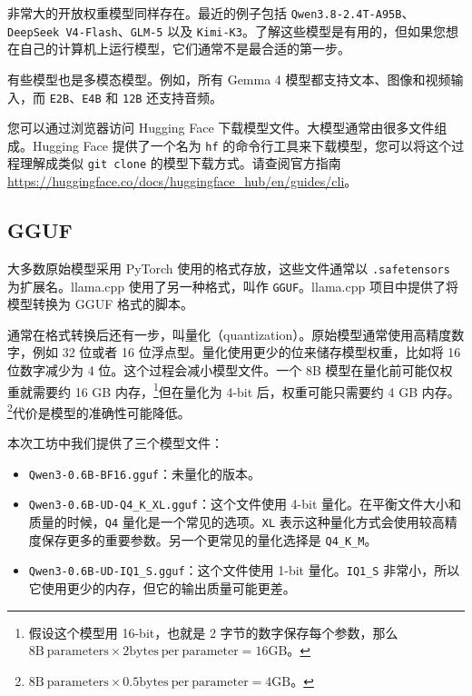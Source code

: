 \documentclass[a4paper,12pt]{article}
\begin{document}
非常大的开放权重模型同样存在。最近的例子包括 \texttt{Qwen3.8-2.4T-A95B}、\texttt{DeepSeek V4-Flash}、\texttt{GLM-5} 以及 \texttt{Kimi-K3}。了解这些模型是有用的，但如果您想在自己的计算机上运行模型，它们通常不是最合适的第一步。

有些模型也是多模态模型。例如，所有 Gemma 4 模型都支持文本、图像和视频输入，而 \texttt{E2B}、\texttt{E4B} 和 \texttt{12B} 还支持音频。

您可以通过浏览器访问 Hugging Face 下载模型文件。大模型通常由很多文件组成。Hugging Face 提供了一个名为 \texttt{hf} 的命令行工具来下载模型，您可以将这个过程理解成类似 \verb|git clone| 的模型下载方式。请查阅官方指南 \url{https://huggingface.co/docs/huggingface_hub/en/guides/cli}。

\subsection{GGUF}
\label{sec:gguf}

大多数原始模型采用 PyTorch 使用的格式存放，这些文件通常以 \texttt{.safetensors} 为扩展名。llama.cpp 使用了另一种格式，叫作 \texttt{GGUF}。llama.cpp 项目中提供了将模型转换为 GGUF 格式的脚本。

通常在格式转换后还有一步，叫量化（quantization）。原始模型通常使用高精度数字，例如 32 位或者 16 位浮点型。量化使用更少的位来储存模型权重，比如将 16 位数字减少为 4 位。这个过程会减小模型文件。一个 8B 模型在量化前可能仅权重就需要约 16 GB 内存，\footnote{假设这个模型用 16-bit，也就是 2 字节的数字保存每个参数，那么 $8 \mathrm{B}\ \mathrm{parameters} \times 2 \mathrm{bytes\ per\ parameter} = 16 \mathrm{GB}$。}但在量化为 4-bit 后，权重可能只需要约 4 GB 内存。\footnote{$8 \mathrm{B}\ \mathrm{parameters} \times 0.5 \mathrm{bytes\ per\ parameter} = 4 \mathrm{GB}$。}代价是模型的准确性可能降低。

本次工坊中我们提供了三个模型文件：

\begin{itemize}
\item \texttt{Qwen3-0.6B-BF16.gguf}：未量化的版本。
\item \texttt{Qwen3-0.6B-UD-Q4\_K\_XL.gguf}：这个文件使用 4-bit 量化。在平衡文件大小和质量的时候，\texttt{Q4} 量化是一个常见的选项。\texttt{XL} 表示这种量化方式会使用较高精度保存更多的重要参数。另一个更常见的量化选择是 \texttt{Q4\_K\_M}。
\item \texttt{Qwen3-0.6B-UD-IQ1\_S.gguf}：这个文件使用 1-bit 量化。\texttt{IQ1\_S} 非常小，所以它使用更少的内存，但它的输出质量可能更差。
\end{itemize}
\end{document}
